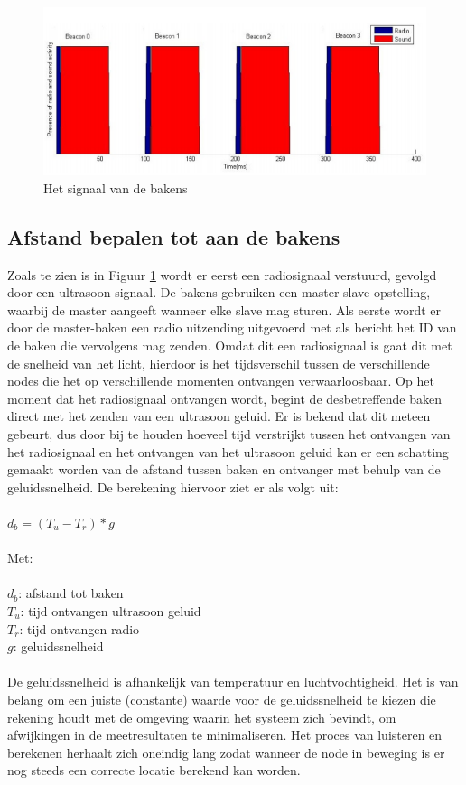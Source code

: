 \documentclass{article}
\begin{document}
\begin{figure}[h]
\centering\includegraphics[]{berichten_bakens.png}
\caption{Het signaal van de bakens}
\label{uitzenden_bakens}
\end{figure}
	
\subsection{Afstand bepalen tot aan de bakens}
Zoals te zien is in Figuur \ref{uitzenden_bakens} wordt er eerst een radiosignaal verstuurd, gevolgd door een ultrasoon signaal. De bakens gebruiken een master-slave opstelling, waarbij de master aangeeft wanneer elke slave mag sturen. Als eerste wordt er door de master-baken een radio uitzending uitgevoerd met als bericht het ID van de baken die vervolgens mag zenden. Omdat dit een radiosignaal is gaat dit met de snelheid van het licht, hierdoor is het tijdsverschil tussen de verschillende nodes die het op verschillende momenten ontvangen verwaarloosbaar. Op het moment dat het radiosignaal ontvangen wordt, begint de desbetreffende baken direct met het zenden van een ultrasoon geluid. Er is bekend dat dit meteen gebeurt, dus door bij te houden hoeveel tijd verstrijkt tussen het ontvangen van het radiosignaal en het ontvangen van het ultrasoon geluid kan er een schatting gemaakt worden van de afstand tussen baken en ontvanger met behulp van de geluidssnelheid. De berekening hiervoor ziet er als volgt uit:\\
\\
	\indent$ d_b = (T_u- T_r) * g $\\
	\\
	Met:\\
	\\
	\indent$ d_b$: afstand tot baken\\
	\indent$T_u$: tijd ontvangen ultrasoon geluid\\
	\indent$T_r$: tijd ontvangen radio\\
	\indent$g$: geluidssnelheid\\
\\
De geluidssnelheid is afhankelijk van temperatuur en luchtvochtigheid. Het is van belang om een juiste (constante) waarde voor de geluidssnelheid te kiezen die rekening houdt met de omgeving waarin het systeem zich bevindt, om afwijkingen in de meetresultaten te minimaliseren. Het proces van luisteren en berekenen herhaalt zich oneindig lang zodat wanneer de node in beweging is er nog steeds een correcte locatie berekend kan worden. 
	
\end{document}
